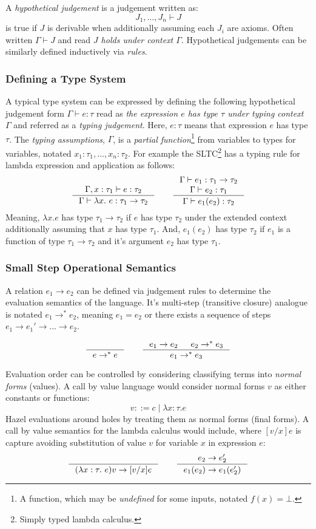 A \textit{hypothetical judgement} is a judgement written as: 
\[J_1, \dots, J_n \vdash J\]
is true if $J$ is derivable when additionally assuming each $J_i$ are axioms. Often written $\Gamma \vdash J$ and read \textit{$J$ holds under context $\Gamma$}. Hypothetical judgements can be similarly defined inductively via \textit{rules}.

\subsubsection{Defining a Type System}\label{sec:TypingJudgements}
A typical type system can be expressed by defining the following hypothetical judgement form $\Gamma \vdash e : \tau$ read as \textit{the expression $e$ has type $\tau$ under typing context $\Gamma$} and referred as a \textit{typing judgement}. Here, $e : \tau$ means that expression $e$ has type $\tau$.  The \textit{typing assumptions}, $\Gamma$, is a \textit{partial function}\footnote{A function, which may be \textit{undefined} for some inputs, notated $f(x) = \bot$.} \cite{PartialFunctions} from variables to types for variables, notated $x_1 : \tau_1, \dots, x_n : \tau_2$. For example the SLTC\footnote{Simply typed lambda calculus.} \cite[ch. 9]{TAPL} has a typing rule for lambda expression and application as follows:
\[\inference{\Gamma, x : \tau_1 \vdash e : \tau_2}{\Gamma \vdash \lambda x.\ e : \tau_1 \to \tau_2} \qquad \inference{\Gamma \vdash e_1 : \tau_1 \to \tau_2\\ \Gamma \vdash e_2 : \tau_1}{\Gamma \vdash e_1(e_2) : \tau_2}\]
Meaning, $\lambda x. e$ has type $\tau_1 \to \tau_2$ if $e$ has type $\tau_2$ under the extended context additionally assuming that $x$ has type $\tau_1$.
And, $e_1(e_2)$ has type $\tau_2$ if $e_1$ is a function of type $\tau_1 \to \tau_2$ and it's argument $e_2$ has type $\tau_1$.

\subsubsection{Small Step Operational Semantics}
A relation $e_1 \to e_2$ can be defined via judgement rules to determine the evaluation semantics of the language. It's multi-step (transitive closure) analogue is notated $e_1 \to^{*} e_2$, meaning $e_1 = e_2$ or there exists a sequence of steps $e_1 \to e_1' \to ... \to e_2$.

\[\inference{}{e \to^{*} e}\qquad \inference{e_1 \to e_2 & e_2 \to^{*} e_3}{e_1 \to^{*} e_3}\]

Evaluation order can be controlled by considering classifying terms into \textit{normal forms} (values). A call by value language would consider normal forms $v$ as either constants or functions:
\[v ::= c \mid \lambda x : \tau. e\]
Hazel evaluations around holes by treating them as normal forms (final forms). A call by value semantics for the lambda calculus would include, where $[v/x]e$ is capture avoiding substitution of value $v$ for variable $x$ in expression $e$:
\[\inference{}{(\lambda x :\tau.\ e)v \to [v/x]e} \qquad \inference{e_2 \to e_2'}{e_1(e_2) \to e_1(e_2')}\]